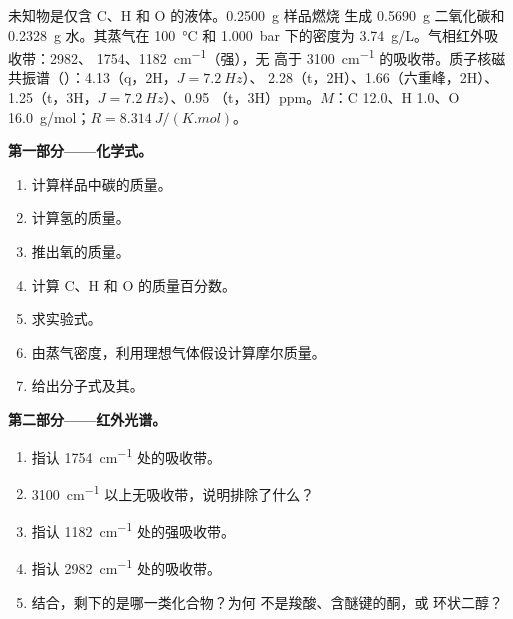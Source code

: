 \begin{problem}
\label{pb:b1:structure-spectroscopy:1}
未知物是仅含 C、H 和 O 的液体。\qty{0.2500}{g} 样品燃烧
生成 \qty{0.5690}{g} 二氧化碳和
\qty{0.2328}{g} 水。其蒸气在
\qty{100}{\celsius} 和 \qty{1.000}{bar} 下的密度为 \qty{3.74}{g/L}。气相红外吸收带：2982、
1754、\qty{1182}{cm^{-1}}（强），无
高于 \qty{3100}{cm^{-1}} 的吸收带。质子核磁共振谱（）：4.13（q，2H，$J = \qty{7.2}{Hz}$）、
2.28（t，2H）、1.66（六重峰，2H）、1.25（t，3H，$J = \qty{7.2}{Hz}$）、0.95
（t，3H）ppm。$M$：C 12.0、H 1.0、O \qty{16.0}{g/mol}；$R =
\qty{8.314}{J/(K.mol)}$。

\begin{center}
\end{center}

\medskip
\noindent\textbf{第一部分——化学式。}
\begin{enumerate}
  \item 计算样品中碳的质量。
  \item 计算氢的质量。
  \item 推出氧的质量。
  \item 计算 C、H 和 O 的质量百分数。
  \item 求实验式。
  \item 由蒸气密度，利用理想气体假设计算摩尔质量。
  \item 给出分子式及其。
\end{enumerate}

\medskip
\noindent\textbf{第二部分——红外光谱。}
\begin{enumerate}[resume]
  \item 指认 \qty{1754}{cm^{-1}} 处的吸收带。
  \item \qty{3100}{cm^{-1}} 以上无吸收带，说明排除了什么？
  \item 指认 \qty{1182}{cm^{-1}} 处的强吸收带。
  \item 指认 \qty{2982}{cm^{-1}} 处的吸收带。
  \item 结合，剩下的是哪一类化合物？为何
        不是羧酸、含醚键的酮，或
        环状二醇？
\end{enumerate}


\end{problem}
